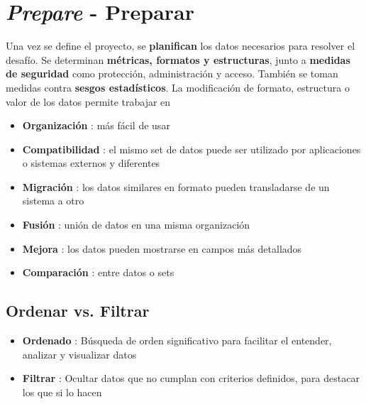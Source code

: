 \section{\textit{Prepare} - Preparar}
Una vez se define el proyecto, se \textbf{planifican} los datos necesarios para resolver el desafío. Se determinan \textbf{métricas, formatos y estructuras}, junto a \textbf{medidas de seguridad} como protección, administración y acceso. También se toman medidas contra \textbf{sesgos estadísticos}. La modificación de formato, estructura o valor de los datos permite trabajar en
\begin{itemize}
    \item {\textbf{Organización} : más fácil de usar}
    \item {\textbf{Compatibilidad} : el mismo set de datos puede ser utilizado por aplicaciones o sistemas externos y diferentes}
    \item {\textbf{Migración} : los datos similares en formato pueden transladarse de un sistema a otro}
    \item {\textbf{Fusión} : unión de datos en una misma organización}
    \item {\textbf{Mejora} : los datos pueden mostrarse en campos más detallados}
    \item {\textbf{Comparación} : entre datos o sets}
\end{itemize}

\subsection{Ordenar vs. Filtrar}
\begin{itemize}
    \item {\textbf{Ordenado} : Búsqueda de orden significativo para facilitar el entender, analizar y visualizar datos}
    \item {\textbf{Filtrar} : Ocultar datos que no cumplan con criterios definidos, para destacar los que si lo hacen}
\end{itemize}

